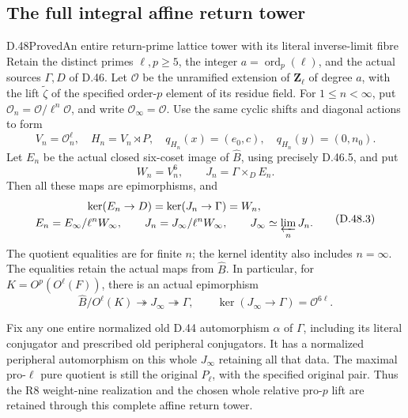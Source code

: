 \subsection{The full integral affine return tower}

\begin{statement}{D.48}{Proved}{An entire return-prime lattice tower with its literal inverse-limit fibre}
Retain the distinct primes \(\ell,p\geq5\), the integer
\(a=\operatorname{ord}_p(\ell)\), and the actual sources
\(\Gamma,D\) of D.46. Let \(\mathcal O\) be the
unramified extension of \(\mathbf Z_\ell\) of degree \(a\),
with the lift \(\widetilde\zeta\) of the specified
order-\(p\) element of its residue field. For
\(1\leq n<\infty\), put
\(\mathcal O_n=\mathcal O/\ell^n\mathcal O\), and
write \(\mathcal O_\infty=\mathcal O\).
Use the same cyclic shifts and diagonal actions to form
\[
 V_n=\mathcal O_n^\ell,\quad
 H_n=V_n\rtimes P,\quad
 q_{H_n}(x)=(e_0,c),\quad q_{H_n}(y)=(0,n_0).
 \tag{D.48.1}
\]
Let \(E_n\) be the actual closed six-coset image of
\(\widehat B\), using precisely D.46.5, and put
\[
 W_n=V_n^6,\qquad J_n=\Gamma\mathbin{\times_D}E_n.
 \tag{D.48.2}
\]
Then all these maps are epimorphisms, and
\[
 \begin{gathered}
 \ker(E_n\to D)=\ker(J_n\to\Gamma)=W_n,\\
 E_n=E_\infty/\ell^nW_\infty,\qquad
 J_n=J_\infty/\ell^nW_\infty,\qquad
 J_\infty\simeq\varprojlim_nJ_n.
 \end{gathered}
 \tag{D.48.3}
\]
The quotient equalities are for finite \(n\); the kernel
identity also includes \(n=\infty\).
The equalities retain the actual maps from \(\widehat B\).
In particular, for \(K=O^p(O^\ell(F))\), there is an
actual epimorphism
\[
 \widehat B/O^\ell(K)\twoheadrightarrow J_\infty
       \twoheadrightarrow\Gamma,
 \qquad\ker(J_\infty\to\Gamma)
          =\mathcal O^{6\ell}.
 \tag{D.48.4}
\]

Fix any one entire normalized old D.44 automorphism
\(\alpha\) of \(\Gamma\), including its literal
conjugator and prescribed old peripheral conjugators.
It has a normalized peripheral automorphism on this
whole \(J_\infty\) retaining all that data.
The maximal pro-\(\ell\) pure quotient is still the
original \(P_\ell\), with the specified original pair.
Thus the R8 weight-nine realization and the chosen
whole relative pro-\(p\) lift are retained through
this complete affine return tower.


\end{statement}

